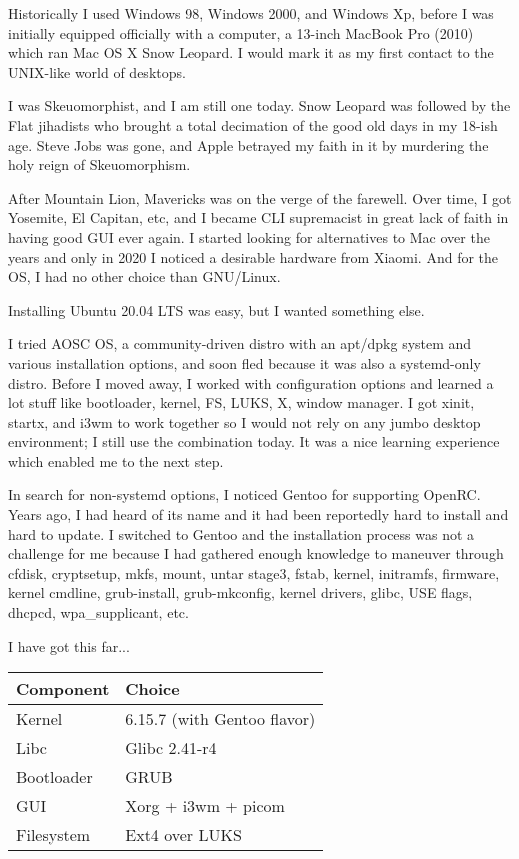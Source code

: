 

Historically I used Windows 98, Windows 2000, and Windows Xp,
before I was initially equipped officially with a computer,
a 13-inch MacBook Pro (2010) which ran Mac OS X Snow Leopard.
I would mark it as my first contact to the UNIX-like world of desktops.

I was Skeuomorphist, and I am still one today.
Snow Leopard was followed by the Flat jihadists who brought a total decimation of the good old days in my 18-ish age.
Steve Jobs was gone, and Apple betrayed my faith in it by murdering the holy reign of Skeuomorphism.

After Mountain Lion, Mavericks was on the verge of the farewell.
Over time, I got Yosemite, El Capitan, etc, and I became CLI supremacist in great lack of faith in having good GUI ever again.
I started looking for alternatives to Mac over the years and only in 2020 I noticed a desirable hardware from Xiaomi.
And for the OS, I had no other choice than GNU/Linux.



Installing Ubuntu 20.04 LTS was easy, but I wanted something else.

I tried AOSC OS, a community-driven distro with an apt/dpkg system and various installation options, and soon fled because it was also a systemd-only distro.
Before I moved away, I worked with configuration options and learned a lot stuff like bootloader, kernel, FS, LUKS, X, window manager.
I got xinit, startx, and i3wm to work together so I would not rely on any jumbo desktop environment; I still use the combination today.
It was a nice learning experience which enabled me to the next step.

In search for non-systemd options, I noticed Gentoo for supporting OpenRC.
Years ago, I had heard of its name and it had been reportedly hard to install and hard to update.
I switched to Gentoo and the installation process was not a challenge for me because I had gathered enough knowledge to maneuver through
cfdisk, cryptsetup, mkfs, mount, untar stage3, fstab, kernel, initramfs, firmware, kernel cmdline, grub-install, grub-mkconfig, kernel drivers,
glibc, USE flags, dhcpcd, wpa\_supplicant, etc.



I have got this far...

\begin{tabu}{XX[2]}
	\toprule
	Component  & Choice                      \\
	\midrule
	Kernel     & 6.15.7 (with Gentoo flavor) \\
	Libc       & Glibc 2.41-r4               \\
	Bootloader & GRUB                        \\
	GUI        & Xorg + i3wm + picom         \\
	Filesystem & Ext4 over LUKS              \\
	\bottomrule
\end{tabu}

